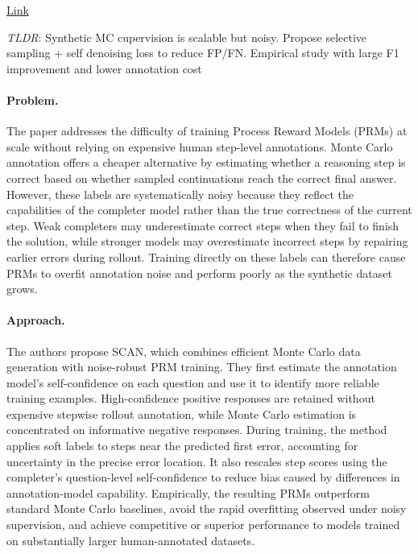 \documentclass[11pt]{article}
\begin{document}
\href{https://arxiv.org/abs/2509.16548}{Link}

\emph{TLDR}: Synthetic MC cupervision is scalable but noisy. Propose selective sampling + self denoising loss to reduce FP/FN. Empirical study with large F1 improvement and lower annotation cost

\paragraph{Problem.}
The paper addresses the difficulty of training Process Reward Models (PRMs) at scale without relying on expensive human step-level annotations. Monte Carlo annotation offers a cheaper alternative by estimating whether a reasoning step is correct based on whether sampled continuations reach the correct final answer. However, these labels are systematically noisy because they reflect the capabilities of the completer model rather than the true correctness of the current step. Weak completers may underestimate correct steps when they fail to finish the solution, while stronger models may overestimate incorrect steps by repairing earlier errors during rollout. Training directly on these labels can therefore cause PRMs to overfit annotation noise and perform poorly as the synthetic dataset grows.

\paragraph{Approach.}
The authors propose SCAN, which combines efficient Monte Carlo data generation with noise-robust PRM training. They first estimate the annotation model's self-confidence on each question and use it to identify more reliable training examples. High-confidence positive responses are retained without expensive stepwise rollout annotation, while Monte Carlo estimation is concentrated on informative negative responses. During training, the method applies soft labels to steps near the predicted first error, accounting for uncertainty in the precise error location. It also rescales step scores using the completer's question-level self-confidence to reduce bias caused by differences in annotation-model capability. Empirically, the resulting PRMs outperform standard Monte Carlo baselines, avoid the rapid overfitting observed under noisy supervision, and achieve competitive or superior performance to models trained on substantially larger human-annotated datasets.
\end{document}

